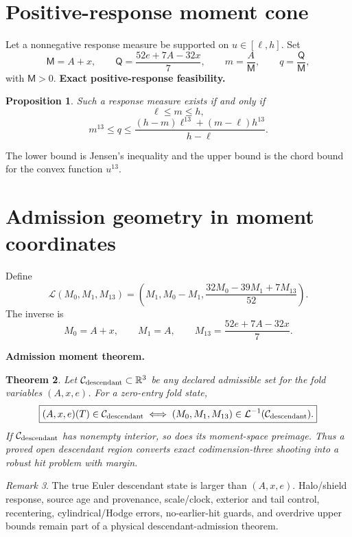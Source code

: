 \documentclass[11pt]{article}
\newtheorem{theorem}{Theorem}[section]\newtheorem{proposition}[theorem]{Proposition}
\theoremstyle{definition}\newtheorem{definition}[theorem]{Definition}\newtheorem{problem}[theorem]{Problem}
\theoremstyle{remark}\newtheorem{remark}[theorem]{Remark}
\begin{document}
\section{Positive-response moment cone}
Let a nonnegative response measure be supported on $u\in[\ell,h]$.  Set
\[
\mathsf M=A+x,\qquad
\mathsf Q=\frac{52e+7A-32x}{7},\qquad
m=\frac{A}{\mathsf M},\qquad q=\frac{\mathsf Q}{\mathsf M},
\]
with $\mathsf M>0$.
\medskip
\noindent\textbf{Exact positive-response feasibility.}
\begin{proposition}
Such a response measure exists if and only if
\[
\boxed{\ell\le m\le h},
\]
\[
\boxed{m^{13}\le q\le
\frac{(h-m)\ell^{13}+(m-\ell)h^{13}}{h-\ell}}.
\]
\end{proposition}
The lower bound is Jensen's inequality and the upper bound is the chord bound
for the convex function $u^{13}$.

\section{Admission geometry in moment coordinates}
Define
\[
\mathcal L(M_0,M_1,M_{13})
=\left(M_1,M_0-M_1,\frac{32M_0-39M_1+7M_{13}}{52}\right).
\]
The inverse is
\[
M_0=A+x,\qquad M_1=A,\qquad
M_{13}=\frac{52e+7A-32x}{7}.
\]

\medskip
\noindent\textbf{Admission moment theorem.}
\begin{theorem}
Let $\mathcal C_{\rm descendant}\subset\mathbb R^3$ be any declared admissible set
for the fold variables $(A,x,e)$.  For a zero-entry fold state,
\[
\boxed{(A,x,e)(T)\in\mathcal C_{\rm descendant}
\iff (M_0,M_1,M_{13})\in\mathcal L^{-1}(\mathcal C_{\rm descendant}).}
\]
If $\mathcal C_{\rm descendant}$ has nonempty interior, so does its moment-space
preimage.  Thus a proved open descendant region converts exact codimension-three
shooting into a robust hit problem with margin.
\end{theorem}
\begin{remark}
The true Euler descendant state is larger than $(A,x,e)$.  Halo/shield response,
source age and provenance, scale/clock, exterior and tail control,
recentering, cylindrical/Hodge errors, no-earlier-hit guards, and overdrive
upper bounds remain part of a physical descendant-admission theorem.
\end{remark}
\end{document}
